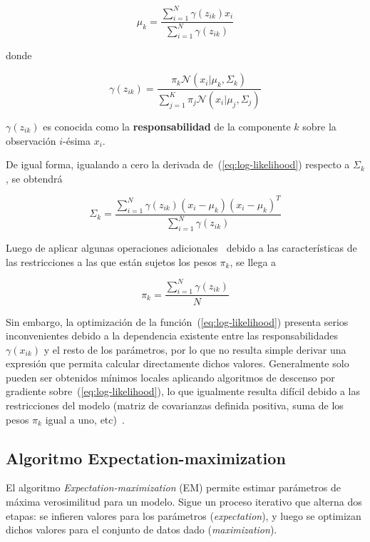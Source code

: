 \begin{equation}
    \label{eq:mu_k}
    \mu_k = \frac{\sum_{i=1}^{N}{\gamma(z_{ik})x_i}}{\sum_{i=1}^{N}{\gamma(z_{ik})}}
\end{equation}

\noindent
donde

\begin{equation}
    \label{eq:gamma}
    \gamma(z_{ik}) = \frac{\pi_k \mathcal{N}(x_i|\mu_k,\Sigma_k)}{\sum_{j=1}^{K}{\pi_j \mathcal{N}(x_i|\mu_j,\Sigma_j)}}
\end{equation}

$\gamma(z_{ik})$ es conocida como la \textbf{responsabilidad} de la componente $k$ sobre la observación $i$-ésima $x_i$.

De igual forma, igualando a cero la derivada de~(\ref{eq:log-likelihood}) respecto a $\Sigma_k$, se obtendrá

\begin{equation}
    \label{eq:Sigma_k}
    \Sigma_k = \frac{\sum_{i=1}^{N}{\gamma(z_{ik})(x_i-\mu_k)(x_i-\mu_k)^T}}{\sum_{i=1}^{N}{\gamma(z_{ik})}}
\end{equation}

Luego de aplicar algunas operaciones adicionales~\cite{Aggarawal13} debido a las características de las restricciones a las que están sujetos los pesos $\pi_k$, se llega a

\begin{equation}
    \label{eq:pi_k}
    \pi_k = \frac{\sum_{i=1}^{N}{\gamma(z_{ik})}}{N}
\end{equation}

Sin embargo, la optimización de la función~(\ref{eq:log-likelihood}) presenta serios inconvenientes debido a la dependencia existente entre las responsabilidades $\gamma(x_{ik})$ y el resto de los parámetros, por lo que no resulta simple derivar una expresión que permita calcular directamente dichos valores.
Generalmente solo pueden ser obtenidos mínimos locales aplicando algoritmos de descenso por gradiente sobre~(\ref{eq:log-likelihood}), lo que igualmente resulta difícil debido a las restricciones del modelo (matriz de covarianzas definida positiva, suma de los pesos $\pi_k$ igual a uno, etc)~\cite{Aggarawal13,Murphy12}.

\subsection{Algoritmo Expectation-maximization}\label{subsec:EM}

El algoritmo \textit{Expectation-maximization} (EM) permite estimar parámetros de máxima verosimilitud para un modelo.
Sigue un proceso iterativo que alterna dos etapas: se infieren valores para los parámetros (\textit{expectation}), y luego se optimizan dichos valores para el conjunto de datos dado (\textit{maximization}).

